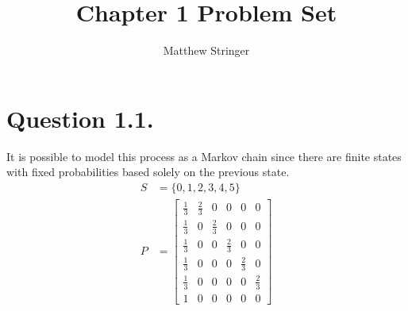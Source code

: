 \documentclass{article}
\title{Chapter 1 Problem Set}
\author{Matthew Stringer}
\date{}
\theoremstyle{definition}
\renewcommand{\ques}[1]{\section*{Question #1.}}
\begin{document}
    \maketitle
    \ques{1.1}
    It is possible to model this process as a Markov chain since there are 
    finite states with fixed probabilities based solely on the previous state.
    \begin{align*}
        S &= \{0, 1, 2, 3, 4, 5\} \\
        P &= 
        \begin{bmatrix}
            \frac{1}{3} & \frac{2}{3} & 0           & 0           & 0           & 0           \\
            \frac{1}{3} & 0           & \frac{2}{3} & 0           & 0           & 0           \\
            \frac{1}{3} & 0           & 0           & \frac{2}{3} & 0           & 0           \\
            \frac{1}{3} & 0           & 0           & 0           & \frac{2}{3} & 0           \\
            \frac{1}{3} & 0           & 0           & 0           & 0           & \frac{2}{3} \\
            1           & 0           & 0           & 0           & 0           & 0          
        \end{bmatrix}
    \end{align*}
\end{document}
